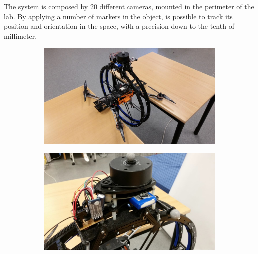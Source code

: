 \noindent The system is composed by 20 different cameras, mounted in the perimeter of the lab. By applying a number of markers in the object, is possible to track its position and orientation in the space, with a precision down to the tenth of millimeter.

\begin{figure}[h]
	\centering
	\begin{subfigure}[t]{0.49\textwidth}
		\centering
		\includegraphics[scale = 0.22]{images/prometheus2.jpg}
		\label{subfig:prometheus1}
	\end{subfigure} 
	\begin{subfigure}[t]{0.49\textwidth}
		\centering
		\includegraphics[scale = 0.2]{images/prometheus5.jpg}
		\label{subfig:prometheus2}
	\end{subfigure}
	\begin{subfigure}[t]{0.49\textwidth}
		\centering

\end{subfigure}
\end{figure}
